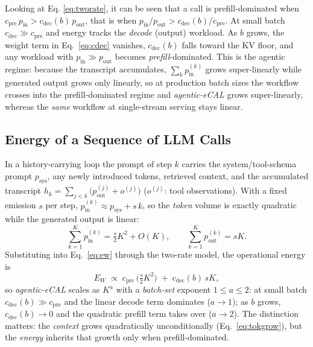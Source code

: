 \documentclass[journal]{IEEEtran}
\newcommand{\agecal}{\textit{agentic-eCAL}}
\begin{document}
Looking at Eq. \ref{eq:tworate}, it can be seen that a call is prefill-dominated when
$c_{\mathrm{pre}}\,p_{\mathrm{in}}>c_{\mathrm{dec}}(b)\,p_{\mathrm{out}}$, that is when
$p_{\mathrm{in}}/p_{\mathrm{out}}>c_{\mathrm{dec}}(b)/c_{\mathrm{pre}}$. At small batch
$c_{\mathrm{dec}}\!\gg\!c_{\mathrm{pre}}$ and energy tracks the \emph{decode} (output) workload. As
$b$ grows, the weight term in Eq.~\eqref{eq:cdec} vanishes, $c_{\mathrm{dec}}(b)$ falls toward the
KV floor, and any workload with $p_{\mathrm{in}}\!\gg\!p_{\mathrm{out}}$ becomes
\emph{prefill}-dominated. This is the agentic regime: because the transcript accumulates, $\sum_k p_{\mathrm{in}}^{(k)}$ grows super-linearly while generated
output grows only linearly, so at production batch sizes the workflow crosses into the
prefill-dominated regime and \agecal{} grows super-linearly, whereas the \emph{same} workflow at
single-stream serving stays linear. 

\subsection{Energy of a Sequence of  LLM Calls}\label{sec:callseq}

In a history-carrying loop the prompt of step $k$
carries the system/tool-schema prompt $p_{\mathrm{sys}}$, any newly introduced tokens, retrieved
context, and the accumulated transcript $h_k=\sum_{j<k}\!\big(p_{\mathrm{out}}^{(j)}+o^{(j)}\big)$
($o^{(j)}$: tool observations). With a fixed emission $s$ per step, $p_{\mathrm{in}}^{(k)}\!\approx\!
p_{\mathrm{sys}}+s\,k$, so the \emph{token} volume is exactly quadratic while the generated output is
linear:
\begin{equation}
\sum_{k=1}^{K} p_{\mathrm{in}}^{(k)} = \tfrac{s}{2}K^2 + O(K),
\qquad
\sum_{k=1}^{K} p_{\mathrm{out}}^{(k)} = sK .
\label{eq:tokgrow}
\end{equation}
Substituting into Eq.~\eqref{eq:ew} through the two-rate model, the operational energy is
\begin{equation}
E_W \;\propto\; c_{\mathrm{pre}}\,\big(\tfrac{s}{2}K^2\big) \;+\; c_{\mathrm{dec}}(b)\,sK ,
\label{eq:ewscale}
\end{equation}
so \agecal{} scales as $K^{a}$ with a \emph{batch-set} exponent $1\!\le\!a\!\le\!2$: at small batch
$c_{\mathrm{dec}}(b)\!\gg\!c_{\mathrm{pre}}$ and the linear decode term dominates ($a\!\to\!1$); as $b$
grows, $c_{\mathrm{dec}}(b)\!\to\!0$ and the quadratic prefill term takes over ($a\!\to\!2$). The
distinction matters: the \emph{context} grows quadratically unconditionally
(Eq.~\eqref{eq:tokgrow}), but the \emph{energy} inherits that growth only when prefill-dominated.
\end{document}
